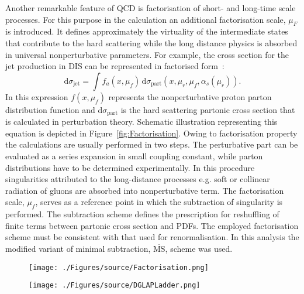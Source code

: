 Another remarkable feature of QCD is factorisation of short- and long-time scale processes. For this purpose in the calculation an additional factorisation scale, $\mu_F$ is introduced. It defines approximately the virtuality of the intermediate states that contribute to the hard scattering while the long distance physics is absorbed in universal nonperturbative parameters. For example, the cross section for the jet production in DIS can be represented in factorised form~\cite{Collins Factorization of Hard Processes in}:
\begin{equation}
 \mathrm{d}\sigma_{\mathrm{jet}} = \int{f_a\left(x,\mu_f\right)}\, \mathrm{d}\sigma_{\mathrm{part}}\left(x,\mu_r, \mu_f, \alpha_s\left(\mu_r\right) \right).
\label{eq:disfactorisation}
\end{equation} 
In this expression $f\left(x,\mu_f\right)$ represents the nonperturbative proton parton distribution function and $\mathrm{d}\sigma_{\mathrm{part}}$ is the hard scattering partonic cross section that is calculated in perturbation theory. Schematic illustration representing this equation is depicted in Figure~\ref{fig:Factorisation}. Owing to factorisation property the calculations are usually performed in two steps. The perturbative part can be evaluated as a series expansion in small coupling constant, while parton distributions have to be determined experimentally. In this procedure singularities attributed to the long-distance processes e.g. soft or collinear radiation of gluons are absorbed into nonperturbative term. The factorisation scale, $\mu_f$, serves as a reference point in which the subtraction of singularity is performed. The subtraction scheme defines the prescription for reshuffling of finite terms between partonic cross section and PDFs. The employed factorisation scheme must be consistent with that used for renormalisation. In this analysis the modified variant of minimal subtraction, $\overline{\mathrm{MS}}$, scheme was used.
\begin{figure}[t]
	\centering
	\begin{subfloat}[]{
		\texttt{[image: ./Figures/source/Factorisation.png]}
		\label{fig:Factorisation}
	 }%
	\end{subfloat}
	\begin{subfloat}[]{
		\texttt{[image: ./Figures/source/DGLAPLadder.png]}
		\label{fig:DGLAPLadder}
	}%
	\end{subfloat}
	\caption{}
\label{fig:factorisationdglapladder}
\end{figure}
